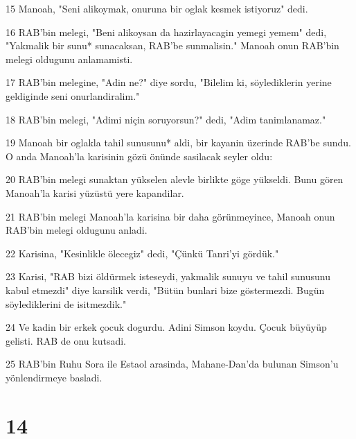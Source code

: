 \par 15 Manoah, "Seni alikoymak, onuruna bir oglak kesmek istiyoruz" dedi.
\par 16 RAB'bin melegi, "Beni alikoysan da hazirlayacagin yemegi yemem" dedi, "Yakmalik bir sunu* sunacaksan, RAB'be sunmalisin." Manoah onun RAB'bin melegi oldugunu anlamamisti.
\par 17 RAB'bin melegine, "Adin ne?" diye sordu, "Bilelim ki, söylediklerin yerine geldiginde seni onurlandiralim."
\par 18 RAB'bin melegi, "Adimi niçin soruyorsun?" dedi, "Adim tanimlanamaz."
\par 19 Manoah bir oglakla tahil sunusunu* aldi, bir kayanin üzerinde RAB'be sundu. O anda Manoah'la karisinin gözü önünde sasilacak seyler oldu:
\par 20 RAB'bin melegi sunaktan yükselen alevle birlikte göge yükseldi. Bunu gören Manoah'la karisi yüzüstü yere kapandilar.
\par 21 RAB'bin melegi Manoah'la karisina bir daha görünmeyince, Manoah onun RAB'bin melegi oldugunu anladi.
\par 22 Karisina, "Kesinlikle ölecegiz" dedi, "Çünkü Tanri'yi gördük."
\par 23 Karisi, "RAB bizi öldürmek isteseydi, yakmalik sunuyu ve tahil sunusunu kabul etmezdi" diye karsilik verdi, "Bütün bunlari bize göstermezdi. Bugün söylediklerini de isitmezdik."
\par 24 Ve kadin bir erkek çocuk dogurdu. Adini Simson koydu. Çocuk büyüyüp gelisti. RAB de onu kutsadi.
\par 25 RAB'bin Ruhu Sora ile Estaol arasinda, Mahane-Dan'da bulunan Simson'u yönlendirmeye basladi.

\chapter{14}

